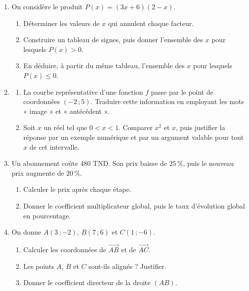 \documentclass[10pt,a4paper]{article}
\begin{document}
\begin{enumerate}
\needspace{22mm}
\item[\textbf{B1.}] On considère le produit $P(x) = (3x + 6)(2 - x)$.
\begin{enumerate}
\item Déterminer les valeurs de $x$ qui annulent chaque facteur.
\item Construire un tableau de signes, puis donner l'ensemble des $x$ pour lesquels $P(x) > 0$.
\item En déduire, à partir du même tableau, l'ensemble des $x$ pour lesquels $P(x) \leqslant 0$.
\end{enumerate}
\par\vspace{1.2mm}
\needspace{22mm}
\item[\textbf{B2.}] \begin{enumerate}
\item La courbe représentative d'une fonction $f$ passe par le point de coordonnées $(-2\,;5)$.
Traduire cette information en employant les mots « image » et « antécédent ».
\item Soit $x$ un réel tel que $0 < x < 1$. Comparer $x^2$ et $x$, puis justifier la réponse
par un exemple numérique et par un argument valable pour tout $x$ de cet intervalle.
\end{enumerate}
\par\vspace{1.2mm}
\needspace{22mm}
\item[\textbf{B3.}] Un abonnement coûte $480$ TND. Son prix baisse de $25\,\%$, puis le nouveau prix
augmente de $20\,\%$.
\begin{enumerate}
\item Calculer le prix après chaque étape.
\item Donner le coefficient multiplicateur global, puis le taux d'évolution global en pourcentage.
\end{enumerate}
\par\vspace{1.2mm}
\needspace{22mm}
\item[\textbf{B4.}] On donne $A(3\,;-2)$, $B(7\,;6)$ et $C(1\,;-6)$.
\begin{enumerate}
\item Calculer les coordonnées de $\vec{AB}$ et de $\vec{AC}$.
\item Les points $A$, $B$ et $C$ sont-ils alignés ? Justifier.
\item Donner le coefficient directeur de la droite $(AB)$.
\end{enumerate}
\par\vspace{1.2mm}
\end{enumerate}
\end{document}
